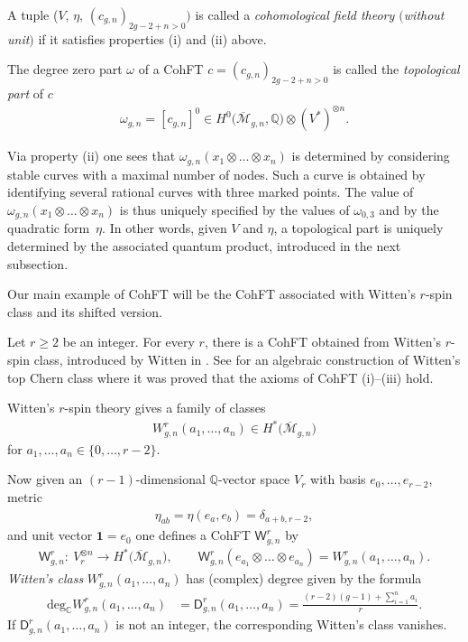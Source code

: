 \documentclass[10pt,a4paper]{amsart}
\def\oM{\overline{\mathcal{M}}}
\def\C{\mathbb{C}}
\def\b1{{\mathbf 1}}
\def\W{\mathsf{W}}
\def\D{\mathsf{D}}
\numberwithin{equation}{section}
\begin{document}
\begin{Remark}\label{cohunit}
A tuple ($V$, $\eta$, $(c_{g,n})_{2g-2+n>0})$ is called a {\em cohomological field theory $($without unit$)$} if it satisfies properties (i) and (ii) above.
\end{Remark}

The degree zero part $\omega$ of a CohFT $c= (c_{g,n})_{2g-2+n>0}$ is called the \emph{topological part} of $c$
 \begin{align*}
 \omega_{g,n} = [c_{g,n}]^0 \in H^0\big(\oM_{g,n},\mathbb{Q}\big) \otimes
(V^*)^{\otimes n}.
 \end{align*}

Via property (ii) one sees that $\omega_{g,n}(x_1 \otimes \dots \otimes x_n)$
is determined by considering stable curves with a maximal number of nodes.
Such a curve is obtained by identifying several rational curves with three marked points. The value of $\omega_{g,n}(x_1 \otimes \dots \otimes x_n)$ is
thus uniquely specified by the values of $\omega_{0,3}$ and by the quadratic form~$\eta$. In other words, given $V$ and $\eta$, a topological part is uniquely determined by the associated quantum product, introduced in the next subsection.

Our main example of CohFT will be the CohFT associated with Witten's $r$-spin class and its shifted version.
\begin{Example}
Let $r\geq2$ be an integer. For every $r$, there is a CohFT obtained from
Witten's $r$-spin class, introduced by Witten in \cite{Witten}. See \cite{P,PV} for an algebraic construction of Witten's top Chern class where
it was proved that the axioms of CohFT (i)--(iii) hold.

Witten's $r$-spin theory gives a family of classes
\begin{align*}
W^r_{g,n}(a_1, \dots, a_n) \in H^*\big(\oM_{g,n}\big) \end{align*}
for $a_1, \dots, a_n \in \{0, \dots, r-2 \}$.

Now given an $(r-1)$-dimensional $\mathbb{Q}$-vector space $V_r$ with basis
 $e_0, \dots, e_{r-2}$, metric
\begin{align*}
\eta_{ab} = \eta(e_a, e_b) =\delta_{a+b,r-2} ,
\end{align*}
and unit vector $\b1 = e_0$ one defines a CohFT $\W^r_{g,n}$ by
\begin{align*}
\W^r_{g,n}\colon\ V_r^{\otimes n} \rightarrow H^*\big(\oM_{g,n}\big),
\qquad
\W^r_{g,n}( e_{a_1} \otimes \dots \otimes e_{a_n}) =
W^r_{g,n}(a_1, \dots, a_n) .
\end{align*}
\emph{Witten's class} $W^r_{g,n}(a_1, \dots, a_n)$ has (complex) degree given
by the formula
\begin{align*}%
\text{deg}_{\C} W^r_{g,n}(a_1, \dots, a_n) & =
\D^r_{g,n}(a_1, \dots, a_n) = \frac{(r-2)(g-1) + \sum_{i=1}^n a_i}{r} .
\end{align*}
If $\D^r_{g,n}(a_1, \dots, a_n)$ is not an integer, the corresponding
Witten's class vanishes.
\end{Example}
\end{document}
